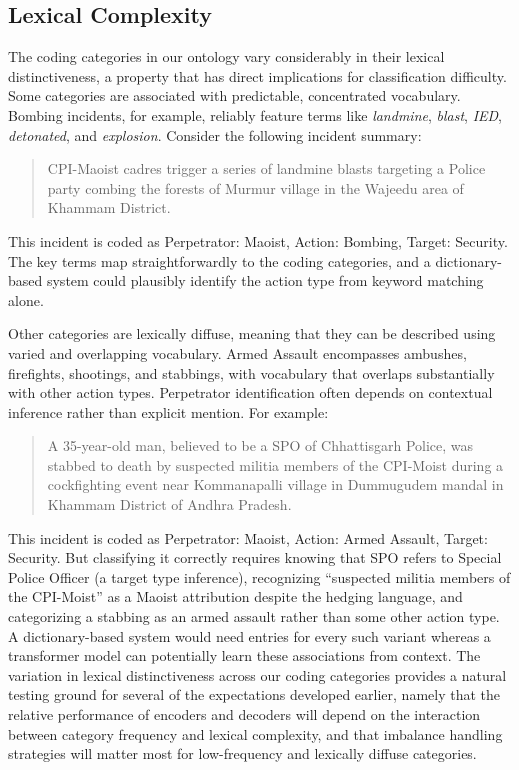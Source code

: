 \documentclass[
  11pt,
]{article}
\begin{document}
\subsection{Lexical Complexity}\label{lexical-complexity}

The coding categories in our ontology vary considerably in their lexical
distinctiveness, a property that has direct implications for
classification difficulty. Some categories are associated with
predictable, concentrated vocabulary. Bombing incidents, for example,
reliably feature terms like \emph{landmine}, \emph{blast}, \emph{IED},
\emph{detonated}, and \emph{explosion}. Consider the following incident
summary:

\begin{quote}
CPI-Maoist cadres trigger a series of landmine blasts targeting a Police
party combing the forests of Murmur village in the Wajeedu area of
Khammam District.
\end{quote}

This incident is coded as Perpetrator: Maoist, Action: Bombing, Target:
Security. The key terms map straightforwardly to the coding categories,
and a dictionary-based system could plausibly identify the action type
from keyword matching alone.

Other categories are lexically diffuse, meaning that they can be
described using varied and overlapping vocabulary. Armed Assault
encompasses ambushes, firefights, shootings, and stabbings, with
vocabulary that overlaps substantially with other action types.
Perpetrator identification often depends on contextual inference rather
than explicit mention. For example:

\begin{quote}
A 35-year-old man, believed to be a SPO of Chhattisgarh Police, was
stabbed to death by suspected militia members of the CPI-Moist during a
cockfighting event near Kommanapalli village in Dummugudem mandal in
Khammam District of Andhra Pradesh.
\end{quote}

This incident is coded as Perpetrator: Maoist, Action: Armed Assault,
Target: Security. But classifying it correctly requires knowing that SPO
refers to Special Police Officer (a target type inference), recognizing
``suspected militia members of the CPI-Moist'' as a Maoist attribution
despite the hedging language, and categorizing a stabbing as an armed
assault rather than some other action type. A dictionary-based system
would need entries for every such variant whereas a transformer model
can potentially learn these associations from context. The variation in
lexical distinctiveness across our coding categories provides a natural
testing ground for several of the expectations developed earlier, namely
that the relative performance of encoders and decoders will depend on
the interaction between category frequency and lexical complexity, and
that imbalance handling strategies will matter most for low-frequency
and lexically diffuse categories.
\end{document}
